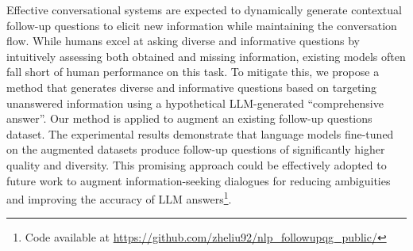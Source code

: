 Effective conversational systems are expected to dynamically generate contextual follow-up questions to elicit new information while maintaining the conversation flow. While humans excel at asking diverse and informative questions by intuitively assessing both obtained and missing information, existing models often fall short of human performance on this task. To mitigate this, we propose a method that generates diverse and informative questions based on targeting unanswered information using a hypothetical LLM-generated ``comprehensive answer''. Our method is applied to augment an existing follow-up questions dataset. The experimental results demonstrate that language models fine-tuned on the augmented datasets produce follow-up questions of significantly higher quality and diversity. This promising approach could be effectively adopted to future work to augment information-seeking dialogues for reducing ambiguities and improving the accuracy of LLM answers\footnote{Code available at \url{https://github.com/zheliu92/nlp_followupqg_public/}}. 
